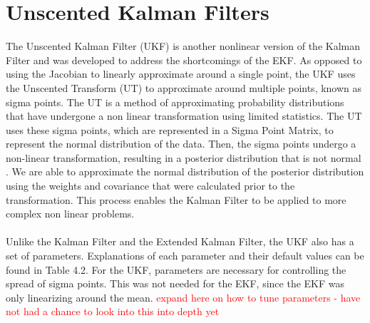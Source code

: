 \chapter{Unscented Kalman Filters}
\label{Unscented Kalman Filters}

The Unscented Kalman Filter (UKF) is another nonlinear version of the Kalman Filter and was developed to address the shortcomings of the EKF. As opposed to using the Jacobian to linearly approximate around a single point, the UKF uses the Unscented Transform (UT) to approximate around multiple points, known as sigma points. The UT is a method of approximating probability distributions that have undergone a non linear transformation using limited statistics. The UT uses these sigma points, which are represented in a Sigma Point Matrix, to represent the normal distribution of the data. Then, the sigma points undergo a non-linear transformation, resulting in a posterior distribution that is not normal \cite{inbook, Wan01theunscented} . We are able to approximate the normal distribution of the posterior distribution using the weights and covariance that were calculated prior to the transformation. This process enables the Kalman Filter to be applied to more complex non linear problems. \\ \\

\noindent Unlike the Kalman Filter and the Extended Kalman Filter, the UKF also has a set of parameters. Explanations of each parameter and their default values can be found in Table 4.2. For the UKF, parameters are necessary for controlling the spread of sigma points. This was not needed for the EKF, since the EKF was only linearizing around the mean. \textcolor{red}{expand here on how to tune parameters - have not had a chance to look into this into depth yet} \\ \\

